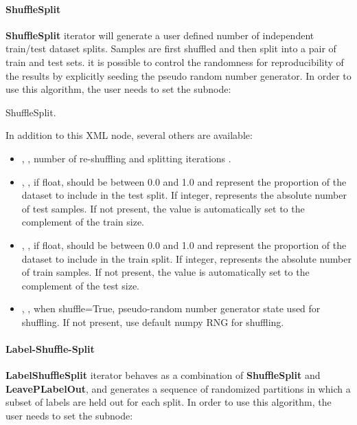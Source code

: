 \paragraph{ShuffleSplit}
\textbf{ShuffleSplit} iterator will generate a user defined number of independent train/test dataset splits. Samples
are first shuffled and then split into a pair of train and test sets. it is possible to control the randomness for
reproducibility of the results by explicitly seeding the  pseudo random number generator.
In order to use this algorithm, the user needs to set the subnode:

ShuffleSplit.

In addition to this XML node, several others are available:
\begin{itemize}
  \item {}, , number of re-shuffling and splitting iterations
    .
  \item {}, , if float, should be between 0.0 and 1.0 and
    represent the proportion of the dataset to include in the test split. 
    If integer, represents the absolute number of test samples. If not present, the value is automatically set to
    the complement of the train size.
  \item {}, , if float, should be between 0.0 and 1.0 and represent
    the proportion of the dataset to include in the train split. If integer, represents the absolute number of train
    samples. If not present, the value is automatically set to the complement of the test size.
  \item {}, , when shuffle=True,
    pseudo-random number generator state used for shuffling. If not present, use default numpy RNG for shuffling.
\end{itemize}

\paragraph{Label-Shuffle-Split}
\textbf{LabelShuffleSplit} iterator behaves as a combination of \textbf{ShuffleSplit} and \textbf{LeavePLabelOut},
and generates a sequence of randomized partitions in which a subset of labels are held out for each split.
In order to use this algorithm, the user needs to set the subnode:

